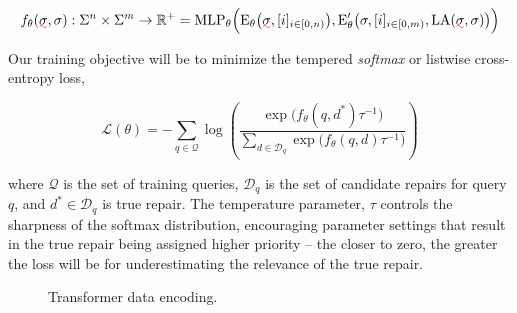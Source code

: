\documentclass[sigplan,review,acmsmall,nonacm,screen,anonymous]{acmart}\settopmatter{printfolios=false,printccs=false,printacmref=false}
\begin{document}
\[
f_\theta(\err\sigma, \sigma): \Sigma^n \times \Sigma^m \rightarrow \mathbb{R}^+ = \text{MLP}_{\theta}\Big(\text{E}_\theta\big(\err\sigma, [i]_{i\in [0, n)}\big), \text{E}_\theta'\big(\sigma, [i]_{i \in [0, m)}, \text{LA}(\err\sigma, \sigma)\big)\Big)
\]

\noindent Our training objective will be to minimize the tempered \textit{softmax} or listwise cross-entropy loss,

\begin{equation}
\mathcal{L}(\theta) = -\sum_{q \in \mathcal{Q}} \log \left( \frac{\exp\big(f_\theta(q, d^*)\tau^{-1}\big)}{\sum_{d \in \mathcal{D}_q} \exp\big(f_\theta(q, d)\tau^{-1}\big)} \right)
\end{equation}

\noindent where $\mathcal{Q}$ is the set of training queries, $\mathcal{D}_q$ is the set of candidate repairs for query $q$, and $d^* \in \mathcal{D}_q$ is true repair. The temperature parameter, $\tau$ controls the sharpness of the softmax distribution, encouraging parameter settings that result in the true repair being assigned higher priority -- the closer to zero, the greater the loss will be for underestimating the relevance of the true repair.


\begin{figure}
\caption{Transformer data encoding.}\label{fig:tx_data_encoding}
\end{figure}
\end{document}
